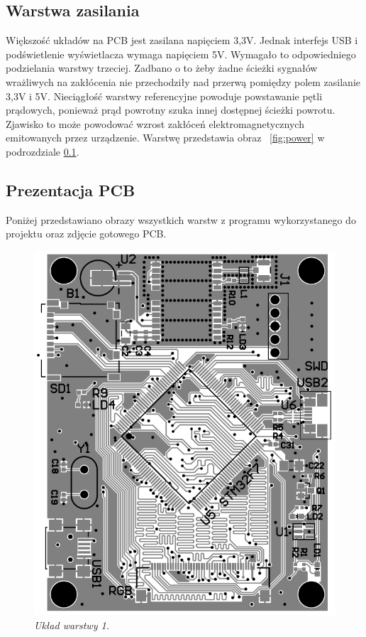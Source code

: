 \documentclass[eng,printmode]{mgr}
\begin{document}
\subsection*{Warstwa zasilania}
Większość układów na PCB jest zasilana napięciem 3,3V. Jednak interfejs USB i podświetlenie wyświetlacza wymaga napięciem 5V. Wymagało to odpowiedniego podzielania warstwy trzeciej. Zadbano o to żeby żadne ścieżki sygnałów wrażliwych na zakłócenia nie przechodziły nad przerwą pomiędzy polem zasilanie 3,3V i 5V. Nieciągłość warstwy referencyjne powoduje powstawanie pętli prądowych, ponieważ prąd powrotny szuka innej dostępnej ścieżki powrotu. Zjawisko to może powodować wzrost zakłóceń elektromagnetycznych emitowanych przez urządzenie. Warstwę przedstawia obraz ~\ref{fig:power} w podrozdziale \ref{pcbOverview}.
\subsection{Prezentacja PCB} \label{pcbOverview}
Poniżej przedstawiano obrazy wszystkich warstw z programu wykorzystanego do projektu oraz zdjęcie gotowego PCB.


\begin{center}\centering
\begin{figure}[!h]
    \centering
    \includegraphics[width=\textwidth]{pcb/top.png}
    \caption{\textit{\scriptsize Układ warstwy 1.}}
\end{figure}
\end{center}
\end{document}
